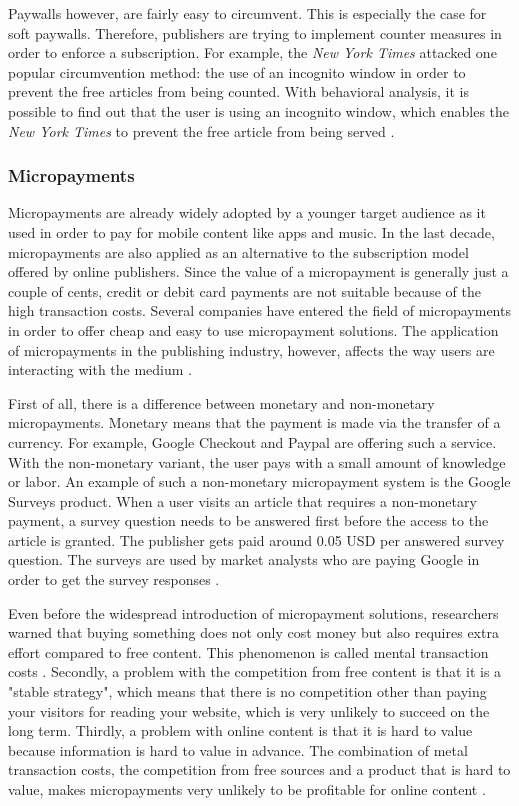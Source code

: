 
Paywalls however, are fairly easy to circumvent. This is especially the case for soft paywalls. Therefore, publishers are trying to implement counter measures in order to enforce a subscription. For example, the \textit{New York Times} attacked one popular circumvention method: the use of an incognito window in order to prevent the free articles from being counted. With behavioral analysis, it is possible to find out that the user is using an incognito window, which enables the \textit{New York Times} to prevent the free article from being served \cite{troupson2015yes}.

\subsubsection{Micropayments}
Micropayments are already widely adopted by a younger target audience as it used in order to pay for mobile content like apps and music. In the last decade, micropayments are also applied as an alternative to the subscription model offered by online publishers. Since the value of a micropayment is generally just a couple of cents, credit or debit card payments are not suitable because of the high transaction costs. Several companies have entered the field of micropayments in order to offer cheap and easy to use micropayment solutions. The application of micropayments in the publishing industry, however, affects the way users are interacting with the medium \cite{geidner2015effects}.

First of all, there is a difference between monetary and non-monetary micropayments. Monetary means that the payment is made via the transfer of a currency. For example, Google Checkout and Paypal are offering such a service. With the non-monetary variant, the user pays with a small amount of knowledge or labor. An example of such a non-monetary micropayment system is the Google Surveys product. When a user visits an article that requires a non-monetary payment, a survey question needs to be answered first before the access to the article is granted. The publisher gets paid around 0.05 USD per answered survey question. The surveys are used by market analysts who are paying Google in order to get the survey responses \cite{googlesurveys}.

Even before the widespread introduction of micropayment solutions, researchers warned that buying something does not only cost money but also requires extra effort compared to free content. This phenomenon is called mental transaction costs \cite{szabo, shirky}. Secondly, a problem with the competition from free content is that it is a "stable strategy", which means that there is no competition other than paying your visitors for reading your website, which is very unlikely to succeed on the long term. Thirdly, a problem with online content is that it is hard to value because information is hard to value in advance. The combination of metal transaction costs, the competition from free sources and a product that is hard to value, makes micropayments very unlikely to be profitable for online content \cite{shirky}.

